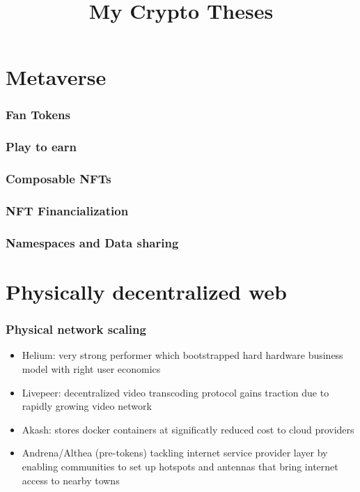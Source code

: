 \documentclass{../notes}
\title{My Crypto Theses}
\begin{document}
\maketitle

\tableofcontents


\part{Metaverse}

\section{Fan Tokens}

\section{Play to earn}

\section{Composable NFTs}

\section{NFT Financialization}

\section{Namespaces and Data sharing}

\part{Physically decentralized web}

\section{Physical network scaling}
\begin{itemize}
    \item Helium: very strong performer which bootstrapped hard hardware business model with right user economics
    \item Livepeer: decentralized video transcoding protocol gains traction due to rapidly growing video network
    \item Akash: stores docker containers at significatly reduced cost to cloud providers
    \item Andrena/Althea (pre-tokens) tackling internet service provider layer by enabling communities to set up hotspots and antennas that bring internet access to nearby towns
\end{itemize}
\end{document}
